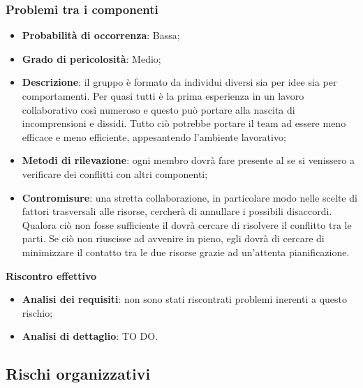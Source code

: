 		\subsubsection{Problemi tra i componenti} %
		\label{ssub:problemi_tra_i_componenti}
			\begin{itemize}
				\item \textbf{Probabilità di occorrenza}: Bassa;
				\item \textbf{Grado di pericolosità}: Medio;
				\item \textbf{Descrizione}: il gruppo è formato da individui diversi sia per idee sia per comportamenti. Per quasi tutti è la prima esperienza in un lavoro collaborativo così numeroso e questo può portare alla nascita di incomprensioni e dissidi. Tutto ciò potrebbe portare il team ad essere meno efficace e meno efficiente, appesantendo l'ambiente lavorativo;
				\item \textbf{Metodi di rilevazione}: ogni membro dovrà fare presente al \roleProjectManager{} se si venissero a verificare dei conflitti con altri componenti;
				\item \textbf{Contromisure}: una stretta collaborazione, in particolare modo nelle scelte di fattori trasversali alle risorse, cercherà di annullare i possibili disaccordi. \newline
				Qualora ciò non fosse sufficiente il \roleProjectManager{} dovrà cercare di risolvere il conflitto tra le parti. Se ciò non riuscisse ad avvenire in pieno, egli dovrà di cercare di minimizzare il contatto tra le due risorse grazie ad un'attenta pianificazione. \newline
			\end{itemize}
		\noindent
		\textbf{Riscontro effettivo}
			\begin{itemize}
				\item \textbf{Analisi dei requisiti}: non sono stati riscontrati problemi inerenti a questo rischio;
				\item \textbf{Analisi di dettaglio}: TO DO.
			\end{itemize}


	\subsection{Rischi organizzativi} %
	\label{sub:rischi_organizzativi}
